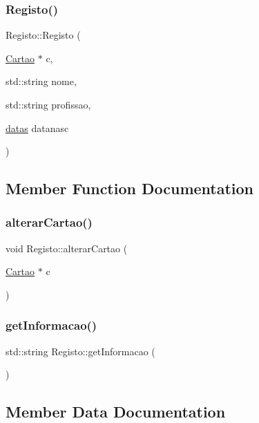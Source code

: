 \subsubsection{\texorpdfstring{Registo()}{Registo()}}
{\footnotesize\ttfamily Registo\+::\+Registo (\begin{DoxyParamCaption}\item[{\mbox{\hyperlink{class_cartao}{Cartao}} $\ast$}]{c,  }\item[{std\+::string}]{nome,  }\item[{std\+::string}]{profissao,  }\item[{\mbox{\hyperlink{structdatas}{datas}}}]{datanasc }\end{DoxyParamCaption})}



\subsection{Member Function Documentation}
\mbox{\label{class_registo_a3d4ce2f7e25614391d1bbe2750fafaaf}} 
\subsubsection{\texorpdfstring{alterar\+Cartao()}{alterarCartao()}}
{\footnotesize\ttfamily void Registo\+::alterar\+Cartao (\begin{DoxyParamCaption}\item[{\mbox{\hyperlink{class_cartao}{Cartao}} $\ast$}]{c }\end{DoxyParamCaption})}

\mbox{\label{class_registo_ac9b651f188464cbc0cb7846d48e2914b}} 
\subsubsection{\texorpdfstring{get\+Informacao()}{getInformacao()}}
{\footnotesize\ttfamily std\+::string Registo\+::get\+Informacao (\begin{DoxyParamCaption}{ }\end{DoxyParamCaption})}



\subsection{Member Data Documentation}
\mbox{\label{class_registo_a081486fcc65a8696797eae018b89ab59}} 

